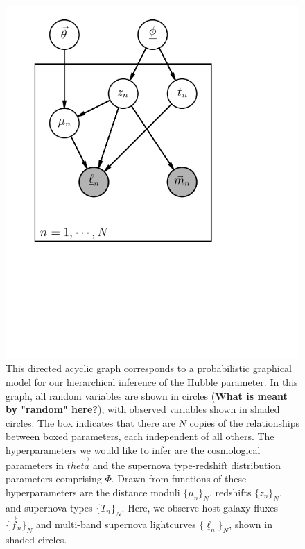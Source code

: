 \documentclass[12pt, onecolumn]{emulateapj}
\newcommand{\textul}{\underline}
\begin{document}
\vspace{1in}
\begin{figure}
\begin{center}
\includegraphics{Hubble-draft.png}
\caption{This directed acyclic graph corresponds to a probabilistic graphical model for our hierarchical inference of the Hubble parameter.  In this graph, all random variables are shown in circles ({\bf What is meant by "random" here?}), with observed variables shown in shaded circles.  The box indicates that there are $N$ copies of the relationships between boxed parameters, each independent of all others.  The hyperparameters we would like to infer are the cosmological parameters in $\vec{theta}$ and the supernova type-redshift distribution parameters comprising $\textul{\Phi}$.  Drawn from functions of these hyperparameters are the distance moduli $\{\mu_{n}\}_{N}$, redshifts $\{z_{n}\}_{N}$, and supernova types $\{T_{n}\}_{N}$.  Here, we observe host galaxy fluxes $\{\vec{f}_{n}\}_{N}$ and multi-band supernova lightcurves $\{\textul{\ell}_{n}\}_{N}$, shown in shaded circles.}
\label{fig:pgm}
\end{center}
\end{figure}
\vspace{1in}
\end{document}
